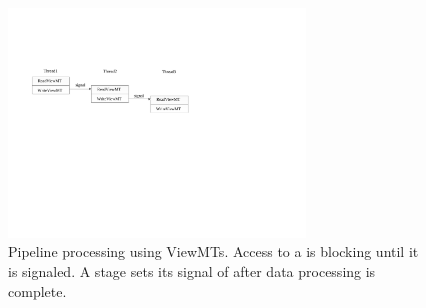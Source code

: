 \begin{figure}[tp]
  \includegraphics[width=3.1in]{../viewmt}
  \caption{Pipeline processing using ViewMTs. Access to a  is
  blocking until it is signaled. A stage sets its signal of 
after data processing is complete.}
  \label{fig:viewmt}
\end{figure}

